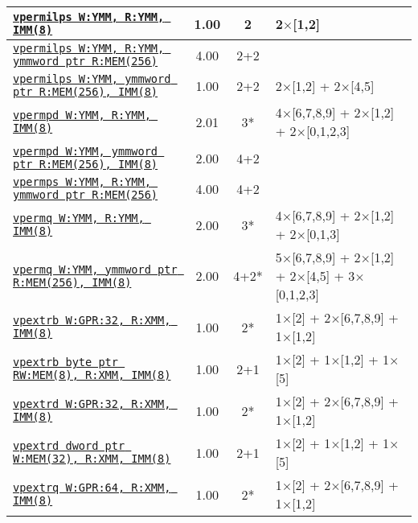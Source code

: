 \documentclass[a4paper,english,fontsize=9]{scrartcl}
\begin{document}
\begin{longtable}{p{}ccL{.25\textwidth}}
  \midrule
  \texttt{\href{https://felixcloutier.com/x86/VPERMILPS.html}{vpermilps W:YMM, R:YMM, IMM(8)}} & 1.00 & 2 & 2\(\times\)[1,2] \\
  \midrule
  \texttt{\href{https://felixcloutier.com/x86/VPERMILPS.html}{vpermilps W:YMM, R:YMM, ymmword ptr R:MEM(256)}} & 4.00 & 2+2 &  \\
  \midrule
  \texttt{\href{https://felixcloutier.com/x86/VPERMILPS.html}{vpermilps W:YMM, ymmword ptr R:MEM(256), IMM(8)}} & 1.00 & 2+2 & 2\(\times\)[1,2] + 2\(\times\)[4,5] \\
  \midrule
  \texttt{\href{https://felixcloutier.com/x86/VPERMPD.html}{vpermpd W:YMM, R:YMM, IMM(8)}} & 2.01 & 3* & 4\(\times\)[6,7,8,9] + 2\(\times\)[1,2] + 2\(\times\)[0,1,2,3] \\
  \midrule
  \texttt{\href{https://felixcloutier.com/x86/VPERMPD.html}{vpermpd W:YMM, ymmword ptr R:MEM(256), IMM(8)}} & 2.00 & 4+2 &  \\
  \midrule
  \texttt{\href{https://felixcloutier.com/x86/VPERMPS.html}{vpermps W:YMM, R:YMM, ymmword ptr R:MEM(256)}} & 4.00 & 4+2 &  \\
  \midrule
  \texttt{\href{https://felixcloutier.com/x86/VPERMQ.html}{vpermq W:YMM, R:YMM, IMM(8)}} & 2.00 & 3* & 4\(\times\)[6,7,8,9] + 2\(\times\)[1,2] + 2\(\times\)[0,1,3] \\
  \midrule
  \texttt{\href{https://felixcloutier.com/x86/VPERMQ.html}{vpermq W:YMM, ymmword ptr R:MEM(256), IMM(8)}} & 2.00 & 4+2* & 5\(\times\)[6,7,8,9] + 2\(\times\)[1,2] + 2\(\times\)[4,5] + 3\(\times\)[0,1,2,3] \\
  \midrule
  \texttt{\href{https://felixcloutier.com/x86/PEXTRB:PEXTRD:PEXTRQ.html}{vpextrb W:GPR:32, R:XMM, IMM(8)}} & 1.00 & 2* & 1\(\times\)[2] + 2\(\times\)[6,7,8,9] + 1\(\times\)[1,2] \\
  \midrule
  \texttt{\href{https://felixcloutier.com/x86/PEXTRB:PEXTRD:PEXTRQ.html}{vpextrb byte ptr RW:MEM(8), R:XMM, IMM(8)}} & 1.00 & 2+1 & 1\(\times\)[2] + 1\(\times\)[1,2] + 1\(\times\)[5] \\
  \midrule
  \texttt{\href{https://felixcloutier.com/x86/PEXTRB:PEXTRD:PEXTRQ.html}{vpextrd W:GPR:32, R:XMM, IMM(8)}} & 1.00 & 2* & 1\(\times\)[2] + 2\(\times\)[6,7,8,9] + 1\(\times\)[1,2] \\
  \midrule
  \texttt{\href{https://felixcloutier.com/x86/PEXTRB:PEXTRD:PEXTRQ.html}{vpextrd dword ptr W:MEM(32), R:XMM, IMM(8)}} & 1.00 & 2+1 & 1\(\times\)[2] + 1\(\times\)[1,2] + 1\(\times\)[5] \\
  \midrule
  \texttt{\href{https://felixcloutier.com/x86/PEXTRB:PEXTRD:PEXTRQ.html}{vpextrq W:GPR:64, R:XMM, IMM(8)}} & 1.00 & 2* & 1\(\times\)[2] + 2\(\times\)[6,7,8,9] + 1\(\times\)[1,2] \\

\end{longtable}
\end{document}
